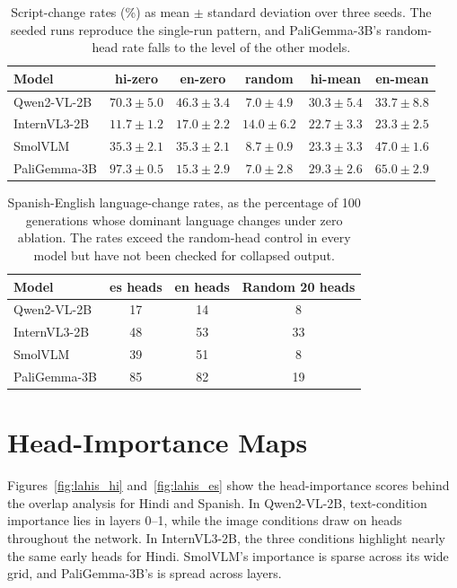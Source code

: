 \documentclass[10pt]{article}
\begin{document}
\begin{table}[H]
\centering
\caption{Script-change rates (\%) as mean $\pm$ standard deviation over three seeds. The seeded runs reproduce the single-run pattern, and PaliGemma-3B's random-head rate falls to the level of the other models.}
\label{tab:seeds}
\begin{tabular}{l ccccc}
\toprule
Model & hi-zero & en-zero & random & hi-mean & en-mean \\
\midrule
Qwen2-VL-2B  & $70.3 \pm 5.0$ & $46.3 \pm 3.4$ & $7.0 \pm 4.9$  & $30.3 \pm 5.4$ & $33.7 \pm 8.8$ \\
InternVL3-2B & $11.7 \pm 1.2$ & $17.0 \pm 2.2$ & $14.0 \pm 6.2$ & $22.7 \pm 3.3$ & $23.3 \pm 2.5$ \\
SmolVLM      & $35.3 \pm 2.1$ & $35.3 \pm 2.1$ & $8.7 \pm 0.9$  & $23.3 \pm 3.3$ & $47.0 \pm 1.6$ \\
PaliGemma-3B & $97.3 \pm 0.5$ & $15.3 \pm 2.9$ & $7.0 \pm 2.8$  & $29.3 \pm 2.6$ & $65.0 \pm 2.9$ \\
\bottomrule
\end{tabular}
\end{table}

\begin{table}[H]
\centering
\caption{Spanish-English language-change rates, as the percentage of 100 generations whose dominant language changes under zero ablation. The rates exceed the random-head control in every model but have not been checked for collapsed output.}
\label{tab:es_ablation}
\begin{tabular}{l ccc}
\toprule
Model & es heads & en heads & Random 20 heads \\
\midrule
Qwen2-VL-2B  & 17 & 14 & 8 \\
InternVL3-2B & 48 & 53 & 33 \\
SmolVLM      & 39 & 51 & 8 \\
PaliGemma-3B & 85 & 82 & 19 \\
\bottomrule
\end{tabular}
\end{table}

\section{Head-Importance Maps}
\label{app:lahis}

Figures~\ref{fig:lahis_hi} and~\ref{fig:lahis_es} show the head-importance scores behind the overlap analysis for Hindi and Spanish. In Qwen2-VL-2B, text-condition importance lies in layers 0--1, while the image conditions draw on heads throughout the network. In InternVL3-2B, the three conditions highlight nearly the same early heads for Hindi. SmolVLM's importance is sparse across its wide grid, and PaliGemma-3B's is spread across layers.
\end{document}
